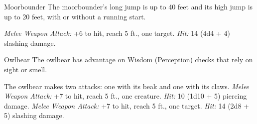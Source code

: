 \documentclass[10pt,a4paper,twoside,twocolumn,openany,bg=none,nodeprecatedcode]{dndbook}
\begin{document}
\begin{DndMonster}[float*=t]{Moorbounder}
\DndMonsterBasics[
armor-class = {13 (natural armor)},
hit-points = {\DndDice{4d10 + 8}},
speed = {70 ft.}
]
\DndMonsterAbilityScores[
 str = 18,
 dex = 14,
 con = 14,
 int = 2,
 wis = 13,
 cha = 5
]
\DndMonsterDetails[
senses = {darkvision 60 ft., passive perception 11},
challenge = 1,
]
The moorbounder's long jump is up to 40 feet and its high jump is up to 20 feet, with or without a running start.
\par
{}
\textsl{Melee Weapon Attack:} +6 to hit, reach 5 ft., one target. \textsl{Hit:} 14 (4d4 + 4) slashing damage.
\end{DndMonster}


\begin{DndMonster}[float*=t]{Owlbear}
\DndMonsterBasics[
armor-class = {13 (natural armor)},
hit-points = {\DndDice{7d10 + 21}},
speed = {40 ft.}
]
\DndMonsterAbilityScores[
 str = 20,
 dex = 12,
 con = 17,
 int = 3,
 wis = 12,
 cha = 7
]
\DndMonsterDetails[
skills = {Perception +3},
senses = {darkvision 60 ft., passive perception 13},
challenge = 3,
]
The owlbear has advantage on Wisdom (Perception) checks that rely on sight or smell.
\par
{}
The owlbear makes two attacks: one with its beak and one with its claws.
\textsl{Melee Weapon Attack:} +7 to hit, reach 5 ft., one creature. \textsl{Hit:} 10 (1d10 + 5) piercing damage.
\textsl{Melee Weapon Attack:} +7 to hit, reach 5 ft., one target. \textsl{Hit:} 14 (2d8 + 5) slashing damage.
\end{DndMonster}
\end{document}
